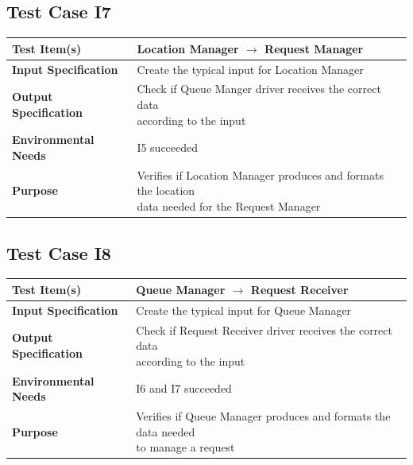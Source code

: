 \documentclass[11pt,titlepage]{article} %
\begin{document}
  \subsection{Test Case I7}
  \begin{table}[ht!]
    \begin{tabular*}{16cm}{ll}
	\hline
	\textbf{Test Item(s)} & Location Manager $ \longrightarrow $ Request Manager \\
	\hline
	\textbf{Input Specification} & Create the typical input for Location Manager \\
	\hline
	\textbf{Output Specification} & \pbox{20cm}{Check if Queue Manger driver receives the correct data \\ according to the input} \\
	\hline
	\textbf{Environmental Needs} & I5 succeeded \\
	\hline
	\textbf{Purpose} & \pbox{20cm}{Verifies if Location Manager produces and formats the location \\ data needed for the Request Manager} \\
	\hline
    \end{tabular*}
  \end{table}
  
  \subsection{Test Case I8}
  \begin{table}[ht!]
    \begin{tabular*}{16cm}{ll}
	\hline
	\textbf{Test Item(s)} & Queue Manager $ \longrightarrow $ Request Receiver \\
	\hline
	\textbf{Input Specification} & Create the typical input for Queue Manager \\
	\hline
	\textbf{Output Specification} & \pbox{20cm}{Check if Request Receiver driver receives the correct data \\ according to the input} \\
	\hline
	\textbf{Environmental Needs} & I6 and I7 succeeded\\
	\hline
	\textbf{Purpose} & \pbox{20cm}{Verifies if Queue Manager produces and formats the data needed \\ to manage a request} \\
	\hline
    \end{tabular*}
  \end{table}
  
\end{document}
